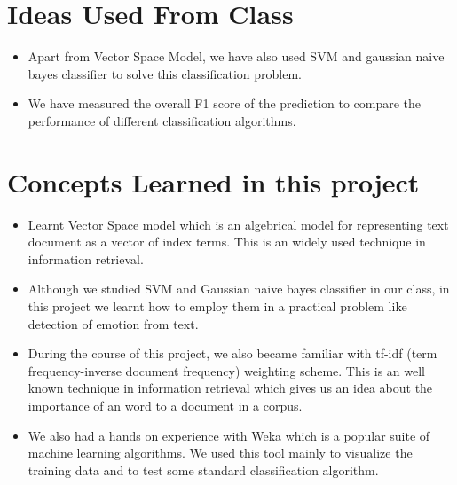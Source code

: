 \section{Ideas Used From Class}
\label{ideas-from-class}
\begin{itemize}
    \item Apart from Vector Space Model, we have also used SVM and gaussian naive bayes classifier to solve this classification problem.
    \item We have measured the overall F1 score of the prediction to compare the
        performance of different classification algorithms.
\end{itemize}

\section{Concepts Learned in this project}
\begin{itemize}
    \item Learnt Vector Space model which is an algebrical model for representing
        text document as a vector of index terms. This is an widely used
        technique in information retrieval.
    \item Although we studied SVM and Gaussian naive bayes classifier in our
        class, in this project we learnt how to employ them in a practical
        problem like detection of emotion from text.
    \item During the course of this project, we also became familiar with
        tf-idf (term frequency-inverse document frequency) weighting scheme.
        This is an well known technique in information retrieval which gives us
        an idea about the importance of an word to a document in a corpus.
    \item We also had a hands on experience with Weka which is a popular suite
        of machine learning algorithms. We used this tool mainly to visualize the
        training data and to test some standard classification algorithm.
\end{itemize}

\newpage
